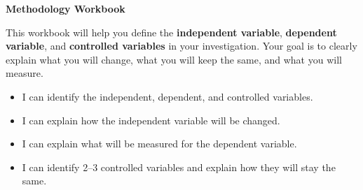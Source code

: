 \documentclass[12pt]{article}
\begin{document}
\thispagestyle{empty}

\vspace*{2cm}

\begin{center}
    {\Huge \textbf{Methodology Workbook}}\\[1em]
\end{center}

\vspace{2em}

\begin{tcolorbox}[colback=mygray,colframe=black,title=Purpose]
This workbook will help you define the \textbf{independent variable}, \textbf{dependent variable}, and \textbf{controlled variables} in your investigation. Your goal is to clearly explain what you will change, what you will keep the same, and what you will measure.
\end{tcolorbox}

\begin{tcolorbox}[colback=white,colframe=black,title=Success Criteria]
\begin{itemize}[leftmargin=1.5em]
    \item I can identify the independent, dependent, and controlled variables.
    \item I can explain how the independent variable will be changed.
    \item I can explain what will be measured for the dependent variable.
    \item I can identify 2--3 controlled variables and explain how they will stay the same.
\end{itemize}
\end{tcolorbox}

\begin{tcolorbox}[colback=white,colframe=myblue,title=Name]
\hspace{0.95\textwidth}
\end{tcolorbox}

\begin{tcolorbox}[colback=white,colframe=myblue,title=Class]
\hspace{0.95\textwidth}
\end{tcolorbox}

\begin{tcolorbox}[colback=white,colframe=myblue,title=Investigation Topic]
\hspace{0.95\textwidth}
\end{tcolorbox}
\end{document}
